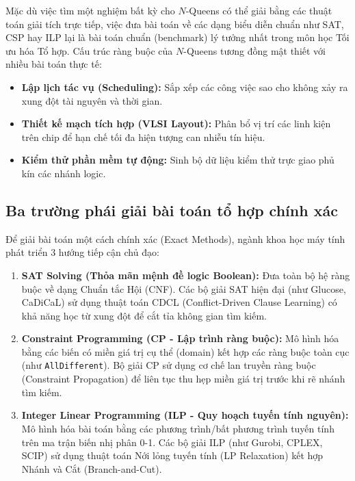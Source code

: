 \documentclass[a4paper,11pt]{article}
\begin{document}
Mặc dù việc tìm một nghiệm bất kỳ cho $N$-Queens có thể giải bằng các thuật toán giải tích trực tiếp, việc đưa bài toán về các dạng biểu diễn chuẩn như SAT, CSP hay ILP lại là bài toán chuẩn (benchmark) lý tưởng nhất trong môn học Tối ưu hóa Tổ hợp. Cấu trúc ràng buộc của $N$-Queens tương đồng mật thiết với nhiều bài toán thực tế:
\begin{itemize}
    \item \textbf{Lập lịch tác vụ (Scheduling):} Sắp xếp các công việc sao cho không xảy ra xung đột tài nguyên và thời gian.
    \item \textbf{Thiết kế mạch tích hợp (VLSI Layout):} Phân bổ vị trí các linh kiện trên chip để hạn chế tối đa hiện tượng can nhiễu tín hiệu.
    \item \textbf{Kiểm thử phần mềm tự động:} Sinh bộ dữ liệu kiểm thử trực giao phủ kín các nhánh logic.
\end{itemize}

\subsection{Ba trường phái giải bài toán tổ hợp chính xác}
Để giải bài toán một cách chính xác (Exact Methods), ngành khoa học máy tính phát triển 3 hướng tiếp cận chủ đạo:
\begin{enumerate}
    \item \textbf{SAT Solving (Thỏa mãn mệnh đề logic Boolean):} Đưa toàn bộ hệ ràng buộc về dạng Chuẩn tắc Hội (CNF). Các bộ giải SAT hiện đại (như Glucose, CaDiCaL) sử dụng thuật toán CDCL (Conflict-Driven Clause Learning) có khả năng học từ xung đột để cắt tỉa không gian tìm kiếm.
    \item \textbf{Constraint Programming (CP - Lập trình ràng buộc):} Mô hình hóa bằng các biến có miền giá trị cụ thể (domain) kết hợp các ràng buộc toàn cục (như \texttt{AllDifferent}). Bộ giải CP sử dụng cơ chế lan truyền ràng buộc (Constraint Propagation) để liên tục thu hẹp miền giá trị trước khi rẽ nhánh tìm kiếm.
    \item \textbf{Integer Linear Programming (ILP - Quy hoạch tuyến tính nguyên):} Mô hình hóa bài toán bằng các phương trình/bất phương trình tuyến tính trên ma trận biến nhị phân 0-1. Các bộ giải ILP (như Gurobi, CPLEX, SCIP) sử dụng thuật toán Nới lỏng tuyến tính (LP Relaxation) kết hợp Nhánh và Cắt (Branch-and-Cut).
\end{enumerate}
\end{document}
